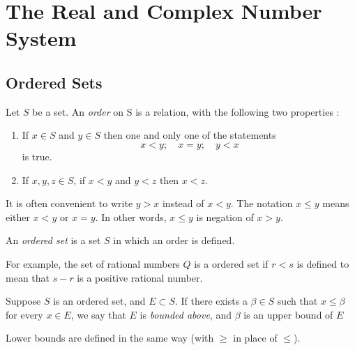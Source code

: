 

\chapter{The Real and Complex Number System}

\bigbreak
\section{Ordered Sets}

\begin{defn}
	\label{ords}
	Let $S$ be a set. An {\it order} on S is a relation,
	with the following two properties :
	\begin{enumerate}
		\item If $x \in S$ and $y \in S$ then one and only one of the statements
			$$ x < y ; \quad x = y ; \quad y < x $$
			is true.
		\item If $x, y, z \in S$, if $x < y$ and $y < z$ then $x < z$.
	\end{enumerate}
	It is often convenient to write $y > x$ instead of $x < y$.
	The notation $x \leq y$ means either $x < y$ or $x = y$.
	In other words, $x \leq y$ is negation of $x > y$.
\end{defn}

\begin{defn}
	An {\it ordered set} is a set $S$ in which an order is defined.
\end{defn}
For example, the set of rational numbers $Q$ is a ordered set if $r < s$
is defined to mean that $s-r$ is a positive rational number.

\begin{defn}
	Suppose $S$ is an ordered set, and $E \subset S$.
	If there exists a $\beta \in S$ such that $x \leq \beta$ for every $x \in E$,
	we say that $E$ is {\it bounded above},
	and $\beta$ is an upper bound of $E$
\end{defn}
Lower bounds are defined in the same way (with $\geq$ in place of $\leq$).

